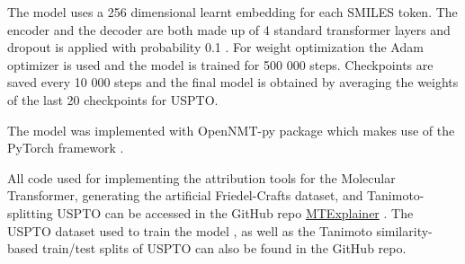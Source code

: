 The model uses a 256 dimensional learnt embedding for each SMILES token. The encoder and the decoder are both made up of 4 standard transformer layers and dropout is applied with probability 0.1 \cite{Srivastava2014Dropout:Overfittin}. For weight optimization the Adam optimizer is used and the model is trained for 500 000 steps. Checkpoints are saved every 10 000 steps and the final model is obtained by averaging the weights of the last 20 checkpoints for USPTO.

The model was implemented with OpenNMT-py package \cite{Klein2017} which makes use of the PyTorch framework \cite{Paszke2019PyTorch:Library}. 

All code used for implementing the attribution tools for the Molecular Transformer, generating the artificial Friedel-Crafts dataset, and Tanimoto-splitting USPTO can be accessed in the GitHub repo \href{https://github.com/davkovacs/MTExplainer.git}{MTExplainer} \cite{Kovacs2020MolecularExplainer}. The USPTO dataset used to train the model \cite{Lowe2012, Jin2017}, as well as the Tanimoto similarity-based train/test splits of USPTO can also be found in the GitHub repo.